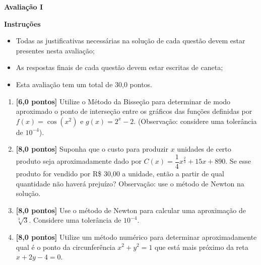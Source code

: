 \documentclass[12pt,a4paper]{article}
\begin{document}
\begin{center}
 \textbf{Avaliação I}
\end{center}

\textbf{Instruções}
\begin{itemize}
 \item Todas as justificativas necessárias na solução de cada questão devem 
 estar presentes nesta avaliação;
 \item As respostas finais de cada questão devem estar escritas de caneta;
 \item Esta avaliação tem um total de 30,0 pontos.
\end{itemize}

\begin{enumerate}
  \item \textbf{[6,0 pontos]} Utilize o Método da Bisseção para determinar de modo
  aproximado o ponto de interseção entre os gráficos das funções definidas por
  $f(x) = \cos\left(x^2\right)$ e $g(x) = 2^x - 2$. (Observação: considere uma
  tolerância de $10^{-4}$).

  \item \textbf{[8,0 pontos]} Suponha que o custo para produzir $x$ unidades de certo produto
  seja aproximadamente dado por $C(x) = \dfrac{1}{4}x^{\frac{2}{3}} + 15x + 890$. Se esse
  produto for vendido por R\$ 30,00 a unidade, então a partir de qual quantidade não
  haverá prejuízo? Observação: use o método de Newton na solução.

  \item \textbf{[8,0 pontos]} Use o método de Newton para calcular uma aproximação 
  de $\sqrt[3]{3}$. Considere uma tolerância de $10^{-4}$.

  \item \textbf{[8,0 pontos]} Utilize um método numérico para determinar aproximadamente qual é o ponto da
  circunferência $x^2 + y^2 = 1$ que está mais próximo da reta $x + 2y - 4 = 0$.

\end{enumerate}
\end{document}
